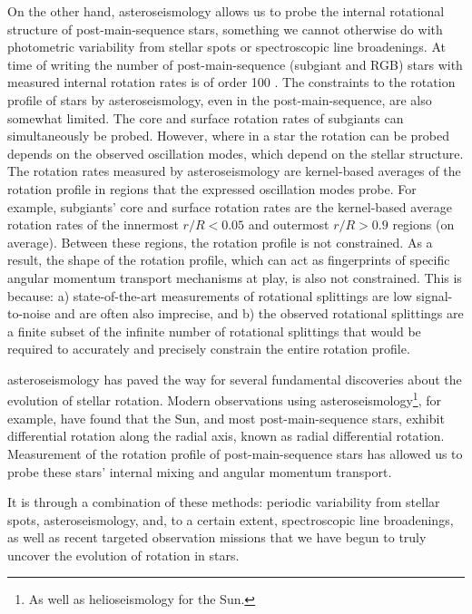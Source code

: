 On the other hand, asteroseismology allows us to probe the internal rotational structure of post-main-sequence stars, something we cannot otherwise do with photometric variability from stellar spots or spectroscopic line broadenings.
At time of writing the number of post-main-sequence (subgiant and RGB) stars with measured internal rotation rates is of order 100 \citep[see, e.g.,][]{deheuvels_seismic_2014,gehan_measuring_2019,li_asteroseismology_2020,li_asteroseismology_2020-1,moyano_asteroseismology_2022}.
The constraints to the rotation profile of stars by asteroseismology, even in the post-main-sequence, are also somewhat limited.
The core and surface rotation rates of subgiants can simultaneously be probed.
However, where in a star the rotation can be probed depends on the observed oscillation modes, which depend on the stellar structure.
The rotation rates measured by asteroseismology are kernel-based averages of the rotation profile in regions that the expressed oscillation modes probe.
For example, subgiants' core and surface rotation rates are the kernel-based average rotation rates of the innermost $r/R<0.05$ and outermost $r/R>0.9$ regions (on average).
Between these regions, the rotation profile is not constrained.
As a result, the shape of the rotation profile, which can act as fingerprints of specific angular momentum transport mechanisms at play, is also not constrained.
This is because: a) state-of-the-art measurements of rotational splittings are low signal-to-noise and are often also imprecise, and b) the observed rotational splittings are a finite subset of the infinite number of rotational splittings that would be required to accurately and precisely constrain the entire rotation profile.

asteroseismology has paved the way for several fundamental discoveries about the evolution of stellar rotation.
Modern observations using asteroseismology\footnote{As well as helioseismology for the Sun.}, for example, have found that the Sun, and most post-main-sequence stars, exhibit differential rotation along the radial axis, known as radial differential rotation.
Measurement of the rotation profile of post-main-sequence stars has allowed us to probe these stars' internal mixing and angular momentum transport. 

It is through a combination of these methods: periodic variability from stellar spots, asteroseismology, and, to a certain extent, spectroscopic line broadenings, as well as recent targeted observation missions that we have begun to truly uncover the evolution of rotation in stars.


